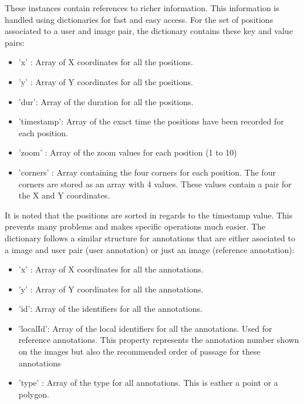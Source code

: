 \documentclass[a4paper,11pt]{report}
\numberwithin{figure}{section} %
\begin{document}
    These instances contain references to richer information.
    This information is handled using dictionaries for fast and easy access.
    For the set of positions associated to a user and image pair, the dictionary contains these key and value pairs:
    \begin{itemize}
        \item[\textbullet] 'x' : Array of X coordinates for all the positions.
        \item[\textbullet] 'y' : Array of Y coordinates for all the positions.
        \item[\textbullet] 'dur': Array of the duration for all the positions.
        \item[\textbullet] 'timestamp': Array of the exact time the positions have been recorded for each position.
        \item[\textbullet] 'zoom' : Array of the zoom values for each position (1 to 10)
        \item[\textbullet] 'corners' : Array containing the four corners for each position.
        The four corners are stored as an array with 4 values.
        These values contain a pair for the X and Y coordinates.
    \end{itemize}

    It is noted that the positions are sorted in regards to the timestamp value.
    This prevents many problems and makes specific operations much easier.
    The dictionary follows a similar structure for annotations that are either asociated to a image and user pair (user annotation) or just an image (reference annotation):
    \begin{itemize}
        \item[\textbullet] 'x' : Array of X coordinates for all the annotations.
        \item[\textbullet] 'y' : Array of Y coordinates for all the annotations.
        \item[\textbullet] 'id': Array of the identifiers for all the annotations.
        \item[\textbullet] 'localId': Array of the local identifiers for all the annotations.
        Used for reference annotations.
        This property represents the annotation number shown on the images but also the recommended order of passage for these annotations
        \item[\textbullet] 'type' : Array of the type for all annotations.
        This is eather a point or a polygon.
    \end{itemize}
\end{document}

